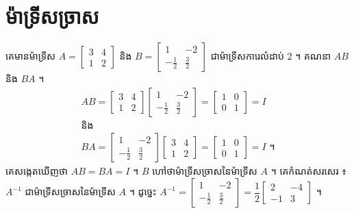 \section{ម៉ាទ្រីសច្រាស}

\begin{example}[ឧទាហរណ៍ ១]
គេមានម៉ាទ្រីស $A = \begin{bmatrix} 3 & 4\\ 1 & 2 \end{bmatrix}$ និង $B = \begin{bmatrix} 1 & -2\\ -\frac{1}{2} & \frac{3}{2} \end{bmatrix}$ ជាម៉ាទ្រីសការេលំដាប់ $2$ ។ គណនា $AB$ និង $BA$ ។
\[
\begin{gathered}
AB = \begin{bmatrix} 3 & 4\\ 1 & 2 \end{bmatrix}\begin{bmatrix} 1 & -2\\ -\frac{1}{2} & \frac{3}{2} \end{bmatrix} = \begin{bmatrix} 1 & 0\\ 0 & 1 \end{bmatrix} = I\\
\text{និង}\\
BA = \begin{bmatrix} 1 & -2\\ -\frac{1}{2} & \frac{3}{2} \end{bmatrix}\begin{bmatrix} 3 & 4\\ 1 & 2 \end{bmatrix} = \begin{bmatrix} 1 & 0\\ 0 & 1 \end{bmatrix} = I \text{ ។}
\end{gathered}
\]
គេសង្កេតឃើញថា $AB = BA = I$ ។ $B$ ហៅថាម៉ាទ្រីសច្រាសនៃម៉ាទ្រីស $A$ ។ គេកំណត់សរសេរ ៖ $A^{-1}$ ជាម៉ាទ្រីសច្រាសនៃម៉ាទ្រីស $A$ ។ ដូច្នេះ $A^{-1} = \begin{bmatrix} 1 & -2\\ -\frac{1}{2} & \frac{3}{2} \end{bmatrix} = \dfrac{1}{2}\begin{bmatrix} 2 & -4\\ -1 & 3 \end{bmatrix}$ ។
\end{example}

